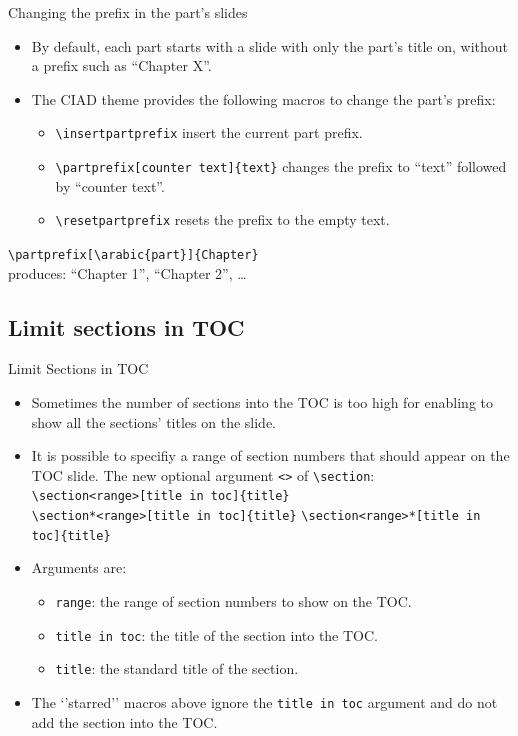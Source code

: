 \documentclass[english,sectioncirclenumberstyle]{ciadbeamer}
\begin{document}
\begin{frame}{Changing the prefix in the part's slides}
	\begin{itemize}
	\item By default, each part starts with a slide with only the part's title on, without a prefix such as ``Chapter X''.
	\vfill
	\item The CIAD theme provides the following macros to change the part's prefix:
		\begin{itemize}
		\item \texttt{{\textbackslash}insertpartprefix} insert the current part prefix.
		\item \texttt{{\textbackslash}partprefix[counter text]\{text\}} changes the prefix to ``text'' followed by ``counter text''.
		\item \texttt{{\textbackslash}resetpartprefix} resets the prefix to the empty text.
		\end{itemize}
	\end{itemize}
	\vfill
	\begin{example}
		\texttt{{\textbackslash}partprefix[{\textbackslash}arabic\{part\}]\{Chapter\}} \\
		produces: ``Chapter 1'', ``Chapter 2'', \dots
	\end{example}
\end{frame}

\subsection{Limit sections in TOC}

\begin{frame}{Limit Sections in TOC}
	\begin{itemize}
	\item Sometimes the number of sections into the TOC is too high for enabling to show all the sections' titles on the slide.
	\item It is possible to specifiy a range of section numbers that should appear on the TOC slide. The new optional argument \texttt{<>} of \texttt{{\textbackslash}section}: \\
		\texttt{{\textbackslash}section<range>[title in toc]\{title\}} \\
		\texttt{{\textbackslash}section*<range>[title in toc]\{title\}}
		\texttt{{\textbackslash}section<range>*[title in toc]\{title\}}
	\vfill
	\item Arguments are: \begin{itemize}
		\item \texttt{range}: the range of section numbers to show on the TOC.
		\item \texttt{title in toc}: the title of the section into the TOC.
		\item \texttt{title}: the standard title of the section.
		\end{itemize}
	\item The `'starred'' macros above ignore the \texttt{title in toc} argument and do not add the section into the TOC.
	\end{itemize}
\end{frame}
\end{document}
